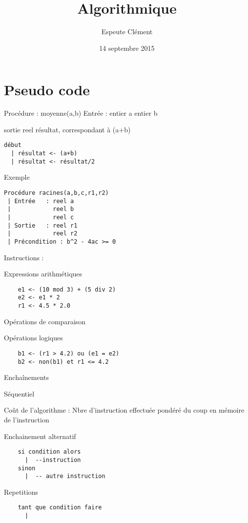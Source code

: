\documentclass[11pt]{article}
\title{Algorithmique}
\author{{\sc Espeute} Clément}
\date{14 septembre 2015}
\begin{document}
\pagestyle{fancy}
\maketitle
\newpage

\section{Pseudo code}
Procédure : moyenne(a,b)
Entrée : entier a
			entier b
			
sortie reel résultat, correspondant à (a+b)

\begin{verbatim}
début
  | résultat <- (a+b)
  | résultat <- résultat/2
\end{verbatim}

Exemple 

\begin{verbatim}
Procédure racines(a,b,c,r1,r2)
 | Entrée   : reel a
 |            reel b
 |            reel c
 | Sortie   : reel r1
 |            reel r2
 | Précondition : b^2 - 4ac >= 0
\end{verbatim}

Instructions :

Expressions arithmétiques
\begin{verbatim}
	e1 <- (10 mod 3) + (5 div 2)
	e2 <- e1 * 2
	r1 <- 4.5 * 2.0
\end{verbatim}

Opérations de comparaison

Opérations logiques
\begin{verbatim}
	b1 <- (r1 > 4.2) ou (e1 = e2)
	b2 <- non(b1) et r1 <= 4.2
\end{verbatim}

Enchaînements

Séquentiel

Coût de l'algorithme : Nbre d'instruction effectuée pondéré du coup en mémoire de l'instruction

Enchainement alternatif

\begin{verbatim}
	si condition alors
	  |  --instruction
	sinon
	  |  -- autre instruction
\end{verbatim}

Repetitions

\begin{verbatim}
	tant que condition faire
	  | 
\end{verbatim}
\end{document}

